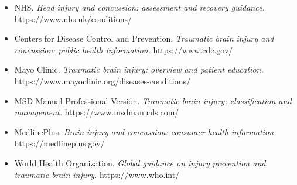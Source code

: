 \begin{itemize}
    \item NHS. \textit{Head injury and concussion: assessment and recovery guidance.} https://www.nhs.uk/conditions/
    \item Centers for Disease Control and Prevention. \textit{Traumatic brain injury and concussion: public health information.} https://www.cdc.gov/
    \item Mayo Clinic. \textit{Traumatic brain injury: overview and patient education.} https://www.mayoclinic.org/diseases-conditions/
    \item MSD Manual Professional Version. \textit{Traumatic brain injury: classification and management.} https://www.msdmanuals.com/
    \item MedlinePlus. \textit{Brain injury and concussion: consumer health information.} https://medlineplus.gov/
    \item World Health Organization. \textit{Global guidance on injury prevention and traumatic brain injury.} https://www.who.int/
\end{itemize}
